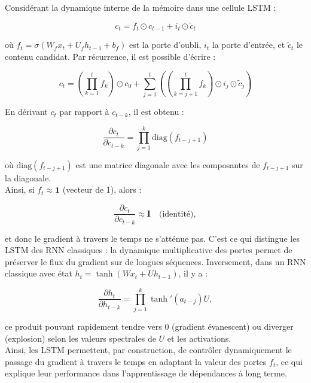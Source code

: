 \begin{preuve}
Considérant la dynamique interne de la mémoire dans une cellule LSTM :

\[
c_t = f_t \odot c_{t-1} + i_t \odot \tilde{c}_t
\]

où $f_t = \sigma(W_f x_t + U_f h_{t-1} + b_f)$ est la porte d’oubli, $i_t$ la porte d’entrée, et $\tilde{c}_t$ le contenu candidat. Par récurrence, il est possible d'écrire :

\[
c_t = \left( \prod_{k=1}^t f_k \right) \odot c_0 + \sum_{j=1}^t \left( \left( \prod_{k=j+1}^{t} f_k \right) \odot i_j \odot \tilde{c}_j \right)
\]

En dérivant $c_t$ par rapport à $c_{t-k}$, il est obtenu :

\[
\frac{\partial c_t}{\partial c_{t-k}} = \prod_{j=1}^{k} \text{diag}(f_{t-j+1})
\]

où $\text{diag}(f_{t-j+1})$ est une matrice diagonale avec les composantes de $f_{t-j+1}$ sur la diagonale.\\

Ainsi, si $f_t \approx \mathbf{1}$ (vecteur de 1), alors :

\[
\frac{\partial c_t}{\partial c_{t-k}} \approx \mathbf{I}
\quad \text{(identité)},
\]

et donc le gradient à travers le temps ne s’atténue pas. C’est ce qui distingue les LSTM des RNN classiques : la dynamique multiplicative des portes permet de préserver le flux du gradient sur de longues séquences. Inversement, dans un RNN classique avec état $h_t = \tanh(W x_t + U h_{t-1})$, il y a :

\[
\frac{\partial h_t}{\partial h_{t-k}} = \prod_{j=1}^{k} \tanh'(a_{t-j}) U,
\]

ce produit pouvant rapidement tendre vers 0 (gradient évanescent) ou diverger (explosion) selon les valeurs spectrales de $U$ et les activations.\\

Ainsi, les LSTM permettent, par construction, de contrôler dynamiquement le passage du gradient à travers le temps en adaptant la valeur des portes $f_t$, ce qui explique leur performance dans l’apprentissage de dépendances à long terme.
\end{preuve}

